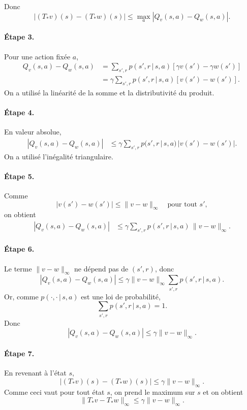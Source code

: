 \documentclass[11pt,a4paper]{article}
\newcommand{\given}{\,|\,}
\begin{document}
Donc
\[
|(T_*v)(s)-(T_*w)(s)| \le \max_a |Q_v(s,a)-Q_w(s,a)|.
\]

\paragraph{Étape 3.}
Pour une action fixée $a$,
\begin{align*}
Q_v(s,a)-Q_w(s,a)
&= \sum_{s',r} p(s',r\given s,a)\left[\gamma v(s')-\gamma w(s')\right] \\
&= \gamma \sum_{s',r} p(s',r\given s,a)\left[v(s')-w(s')\right].
\end{align*}
On a utilisé la linéarité de la somme et la distributivité du produit.

\paragraph{Étape 4.}
En valeur absolue,
\begin{align*}
|Q_v(s,a)-Q_w(s,a)|
&\le \gamma \sum_{s',r} p(s',r\given s,a)\, |v(s')-w(s')|.
\end{align*}
On a utilisé l'inégalité triangulaire.

\paragraph{Étape 5.}
Comme
\[
|v(s')-w(s')| \le \|v-w\|_{\infty} \quad \text{pour tout } s',
\]
on obtient
\begin{align*}
|Q_v(s,a)-Q_w(s,a)|
&\le \gamma \sum_{s',r} p(s',r\given s,a)\, \|v-w\|_{\infty}.
\end{align*}

\paragraph{Étape 6.}
Le terme $\|v-w\|_{\infty}$ ne dépend pas de $(s',r)$, donc
\[
|Q_v(s,a)-Q_w(s,a)| \le \gamma \|v-w\|_{\infty} \sum_{s',r} p(s',r\given s,a).
\]
Or, comme $p(\cdot,\cdot\given s,a)$ est une loi de probabilité,
\[
\sum_{s',r} p(s',r\given s,a)=1.
\]
Donc
\[
|Q_v(s,a)-Q_w(s,a)| \le \gamma \|v-w\|_{\infty}.
\]

\paragraph{Étape 7.}
En revenant à l'état $s$,
\[
|(T_*v)(s)-(T_*w)(s)| \le \gamma \|v-w\|_{\infty}.
\]
Comme ceci vaut pour tout état $s$, on prend le maximum sur $s$ et on obtient
\[
\|T_*v-T_*w\|_{\infty}\le \gamma \|v-w\|_{\infty}.
\]
\end{document}
